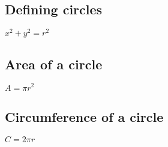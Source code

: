 
\subsection{Defining circles}

\(x^2 + y^2 = r^2\)

\subsection{Area of a circle}

\(A=\pi r^2\)

\subsection{Circumference of a circle}

\(C=2\pi r\)

